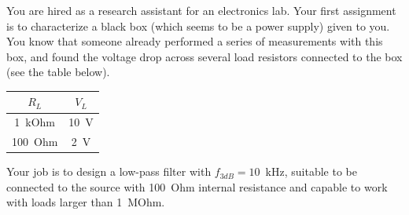 \documentclass[letterpaper,addpoints,answers]{exam}
\begin{document}
\begin{questions}
\pagebreak

\question
You are hired as a research assistant for an electronics lab. Your first
assignment is to characterize a black box (which seems to be a power
supply) given to you.  
You know that someone already performed a series of measurements
with this box, and found the voltage drop across several load resistors
connected to the box (see the table below).

\begin{tabular}{|c|c|}
\hline$R_L$	  &  $V_L$ \\ 
\hline
1~kOhm	&  10~V \\
100~Ohm &  2~V \\
\hline
\end{tabular}


\pagebreak
\question
Your job is to design a low-pass filter with $f_{3dB}=10$~kHz, suitable to
be connected to the source with 100~Ohm internal resistance and capable to
work with loads larger than 1~MOhm.

\end{questions}
\end{document}
